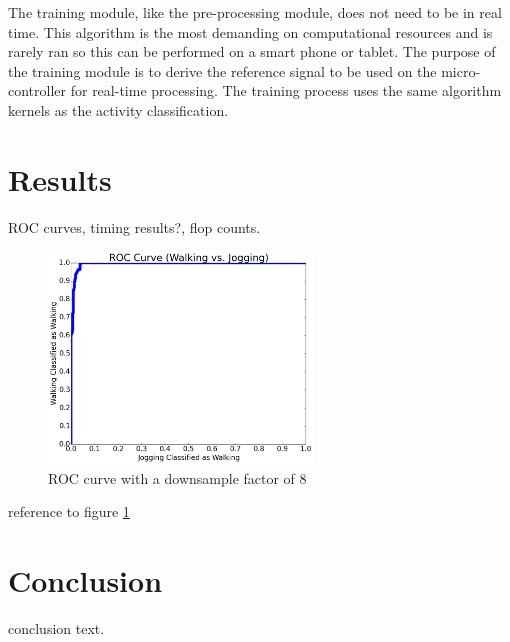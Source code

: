 \documentclass[journal]{IEEEtran}
\begin{document}
The training module, like the pre-processing module, does not need to be in real time.
This algorithm is the most demanding on computational resources and is rarely ran so this can be performed on a smart phone or tablet.
The purpose of the training module is to derive the reference signal to be used on the micro-controller for real-time processing.
The training process uses the same algorithm kernels as the activity classification.
%
\section{Results}
%
ROC curves, timing results?, flop counts.
\begin{figure}[ht!]
  \centering
      \includegraphics[angle=0,width=70mm]{ROC_walk_to_run.png}
  \caption{\label{ROC_walk_to_run_fig}ROC curve with a downsample factor of 8}
\end{figure}
reference to figure \ref{ROC_walk_to_run_fig}
%
\section{Conclusion}
conclusion text.
%
\appendices
%
\ifCLASSOPTIONcaptionsoff
  \newpage
\fi
%


\end{document}
